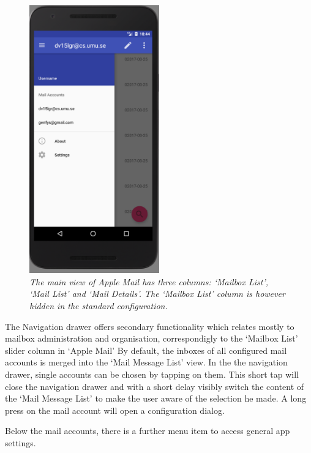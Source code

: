 \documentclass[a4paper,11pt,twoside]{article}
\begin{document}
\begin{figure}[hp!]
  \label{fig:nav_drawer}
  \centering
    \includegraphics[width=0.5\textwidth]{nav_drawer}
    \caption{\textit{The main view of Apple Mail has three columns: `Mailbox List',
    `Mail List' and `Mail Details'. The `Mailbox List' column is however
    hidden in the standard configuration.}}
\end{figure}

The Navigation drawer offers secondary functionality which relates mostly to
mailbox administration and organisation, correspondigly to the `Mailbox List'
slider column in `Apple Mail'  By default, the inboxes of
all configured mail accounts is merged into the `Mail Message List' view. In the
the navigation drawer, single accounts can be chosen by tapping on them. This
short tap will close the navigation drawer and with a short delay visibly switch
the content of the `Mail Message List' to make the user aware of the selection
he made. A long press on the mail account will open a configuration dialog.

Below the mail accounts, there is a further menu item to access general app
settings.
\end{document}
